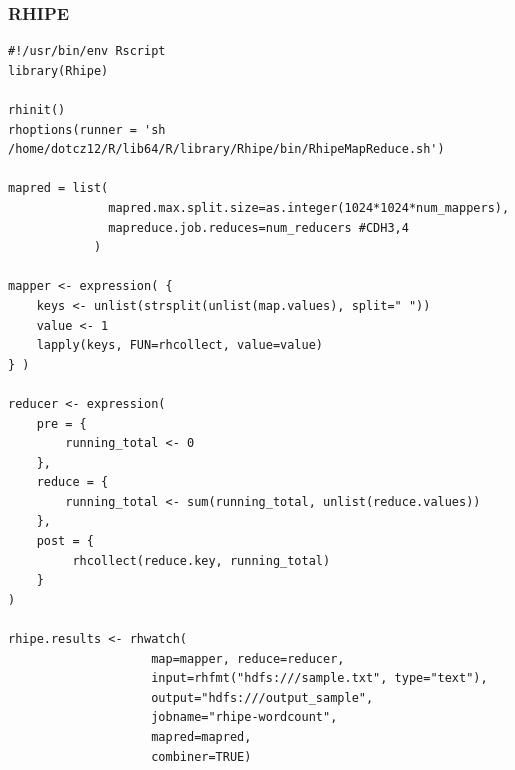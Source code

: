 \documentclass[
journal=jacsat, %
manuscript=article]{achemso}
\begin{document}
\subsubsection{RHIPE}
\begin{lstlisting}[caption=RHIPE mapper/reducer functions]
#!/usr/bin/env Rscript
library(Rhipe)

rhinit()
rhoptions(runner = 'sh /home/dotcz12/R/lib64/R/library/Rhipe/bin/RhipeMapReduce.sh')

mapred = list(
              mapred.max.split.size=as.integer(1024*1024*num_mappers),
              mapreduce.job.reduces=num_reducers #CDH3,4
            )
            
mapper <- expression( {
    keys <- unlist(strsplit(unlist(map.values), split=" "))
    value <- 1
    lapply(keys, FUN=rhcollect, value=value)
} )

reducer <- expression(
    pre = {
        running_total <- 0
    },
    reduce = {
        running_total <- sum(running_total, unlist(reduce.values))
    },
    post = {
         rhcollect(reduce.key, running_total)
    }
)
    
rhipe.results <- rhwatch(
                    map=mapper, reduce=reducer,
                    input=rhfmt("hdfs:///sample.txt", type="text"),
                    output="hdfs:///output_sample",
                    jobname="rhipe-wordcount",
                    mapred=mapred,
                    combiner=TRUE)

\end{lstlisting}
\end{document}

